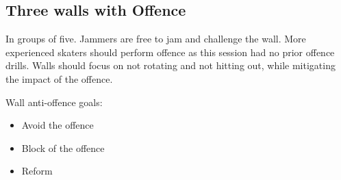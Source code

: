 \subsection*{Three walls with Offence}
\label{drill:three_wall:offence/open}

In groups of five. 
Jammers are free to jam and challenge the wall.
More experienced skaters should perform offence as this session had no prior offence drills.  
Walls should focus on not rotating and not hitting out, while mitigating the impact of the offence.

Wall anti-offence goals:
\begin{itemize}
\item Avoid the offence 
\item Block of the offence 
\item Reform 
\end{itemize}
